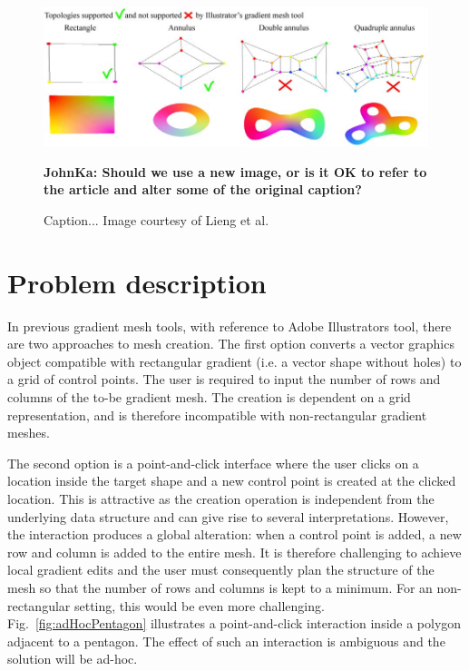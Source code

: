 \documentclass{egpubl}
\newcommand{\note}[3]{{\color{#2}\textbf{#1: #3}}}
\newcommand{\john}[1]{\note{JohnKa}{RubineRed}{#1}}
\begin{document}
	\begin{figure}
		\includegraphics[]{illustratorVsOur.jpg}
		\caption{Caption... Image courtesy of Lieng et al. \cite{Lieng:2016}}
		\john{Should we use a new image, or is it OK to refer to the article and alter some of the original caption?}
		\label{fig:IllustratorVsOur}
	\end{figure}
	
	\section{Problem description}
	\label{sec:overview}
	
	In previous gradient mesh tools, with reference to Adobe Illustrators tool, there are two approaches to mesh creation. The first option converts a vector graphics object compatible with rectangular gradient (i.e. a vector shape without holes) to a grid of control points. The user is required to input the number of rows and columns of the to-be gradient mesh. The creation is dependent on a grid representation, and is therefore incompatible with non-rectangular gradient meshes.
	
	The second option is a point-and-click interface where the user clicks on a location inside the target shape and a new control point is created at the clicked location. This is attractive as the creation operation is independent from the underlying data structure and can give rise to several interpretations. However, the interaction produces a global alteration: when a control point is added, a new row and column is added to the entire mesh. It is therefore challenging to achieve local gradient edits and the user must consequently plan the structure of the mesh so that the number of rows and columns is kept to a minimum. For an non-rectangular setting, this would be even more challenging. Fig.~\ref{fig:adHocPentagon} illustrates a point-and-click interaction inside a polygon adjacent to a pentagon. The effect of such an interaction is ambiguous and the solution will be ad-hoc.
	
\end{document}
